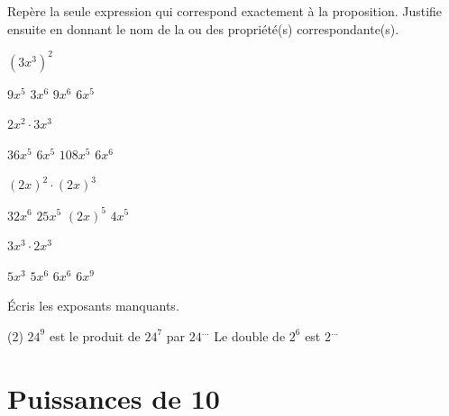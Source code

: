 \documentclass[../../syllabus_2.tex]{subfiles}
\begin{document}
\newpage
\begin{exercise}
	Repère la seule expression qui correspond exactement à la proposition. Justifie ensuite en donnant le nom de la ou des propriété(s) correspondante(s).
	\begin{tasks}
		\task \((3x^3)^2\)
		\begin{qcm}[4]
			\choice \(9x^5\)
			\choice \(3x^6\)
			\choice \(9x^6\)
			\choice \(6x^5\)
		\end{qcm}
		\task \(2x^2\cdot 3x^3\)
		\begin{qcm}[4]
			\choice \(36x^5\)
			\choice \(6x^5\)
			\choice \(108x^5\)
			\choice \(6x^6\)
		\end{qcm}
		\task \((2x)^2\cdot (2x)^3\)
		\begin{qcm}[4]
			\choice \(32x^6\)
			\choice \(25x^5\)
			\choice \((2x)^5\)
			\choice \(4x^5\)
		\end{qcm}
		\task \(3x^3\cdot 2x^3\)
		\begin{qcm}[4]
			\choice \(5x^3\)
			\choice \(5x^6\)
			\choice \(6x^6\)
			\choice \(6x^9\)
		\end{qcm}
	\end{tasks}
\end{exercise}




\begin{exercise}
	Écris les exposants manquants.
	\begin{tasks}(2)
		\task \(24^9\) est le produit de \(24^7\) par \(24^{\dots}\)
		\task Le double de \(2^6\) est \(2^{\dots}\)
	\end{tasks}
\end{exercise}

\newpage
\section{Puissances de 10}
\end{document}
